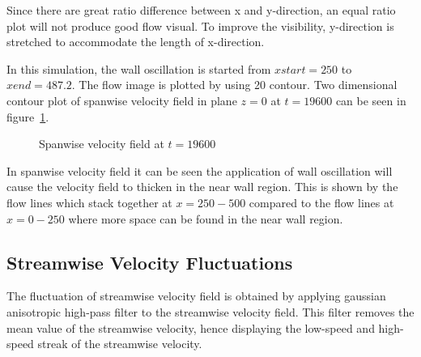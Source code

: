 Since there are great ratio difference between x and y-direction, an equal ratio plot will not produce good flow visual. To improve the visibility, y-direction is stretched to accommodate the length of x-direction.

In this simulation, the wall oscillation is started from $xstart = 250$ to $xend = 487.2$. The flow image is plotted by using 20 contour. Two dimensional contour plot of spanwise velocity field in plane $z=0$ at $t = 19600$ can  be seen in figure~\ref{fig:w(x,y)}.

\begin{figure}[!h]
  \centering
  \caption{Spanwise velocity field at $t = 19600$}
  \label{fig:w(x,y)}
\end{figure}

In spanwise velocity field it can be seen the application of wall oscillation will cause the velocity field to thicken in the near wall region. This is shown by the flow lines which stack together at $x=250-500$ compared to the flow lines at $x=0-250$ where more space can be found in the near wall region.

\subsection{Streamwise Velocity Fluctuations}
The fluctuation of streamwise velocity field is obtained by applying gaussian anisotropic high-pass filter to the streamwise velocity field. This filter removes the mean value of the streamwise velocity, hence displaying the low-speed and high-speed streak of the streamwise velocity.

